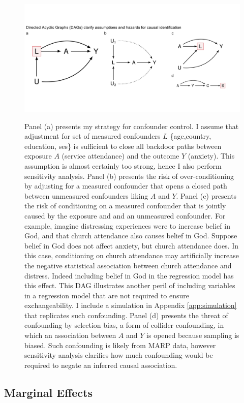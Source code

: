 \documentclass[]{interact}
\theoremstyle{plain}%
\theoremstyle{definition}
\theoremstyle{remark}
\begin{document}
\begin{figure}[h!bt]
\centering
    \caption{Panel (a) presents my strategy for confounder control. I assume that adjustment for set of measured confounders $L$ \{age,country, education, ses\} is sufficient to close all backdoor paths between exposure $A$ (service attendance) and the outcome $Y$ (anxiety). This assumption is almost certainly too strong, hence I also perform sensitivity analysis. Panel (b) presents the risk of over-conditioning by adjusting for a measured confounder that opens a closed path between unmeasured confounders liking $A$ and $Y$. Panel (c) presents the risk of conditioning on a measured confounder that is jointly caused by the exposure and and an unmeasured confounder. For example, imagine distressing experiences were to increase belief in God, and that church attendance also causes belief in God. Suppose belief in God does not affect anxiety, but church attendance does. In this case, conditioning on church attendance may artificially increase the negative statistical association between church attendance and distress. Indeed including belief in God in the regression model has this effect. This DAG illustrates another peril of including variables in a regression model that are not required to ensure exchangeability. I include a simulation in Appendix \ref{app:simulation} that replicates such confounding. Panel (d) presents the threat of confounding by selection bias, a form of collider confounding, in which an association between $A$ and $Y$ is opened because sampling is biased. Such confounding is likely from MARP data, however sensitivity analysis clarifies how much confounding would be required to negate an inferred causal association.} 
    \includegraphics[width=0.99\columnwidth]{figs/daggraph.jpg}
    \label{fig:Figure1}
\end{figure}

\subsection{Marginal Effects}
\end{document}
